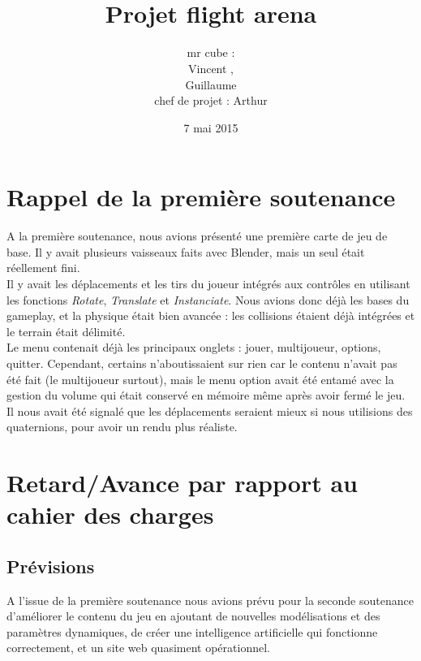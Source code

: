 \documentclass[10pt, titlepage]{report}
\title{\bsc{Rapport de la deuxième soutenance}\\Projet flight arena}
\author{mr cube :\\
Vincent \bsc{Rospini-Clerici},\\
Guillaume \bsc{Rebut}\\
chef de projet : Arthur \bsc{Remaud}}
\date{7 mai 2015}
\begin{document}
\maketitle
\renewcommand{\contentsname}{Sommaire}
\renewcommand{\chaptername}{Partie}

\tableofcontents

\chapter{Rappel de la première soutenance}

A la première soutenance, nous avions présenté une première carte de jeu de base. Il y avait plusieurs vaisseaux faits avec Blender, mais un seul était réellement fini.\\

 Il y avait les déplacements et les tirs du joueur intégrés aux contrôles en utilisant les fonctions \textit{Rotate}, \textit{Translate} et \textit{Instanciate}. Nous avions donc déjà les bases du gameplay, et la physique était bien avancée : les collisions étaient déjà intégrées et le terrain était délimité.\\

Le menu contenait déjà les principaux onglets : jouer, multijoueur, options, quitter. Cependant, certains n'aboutissaient sur rien car le contenu n'avait pas été fait (le multijoueur surtout), mais le menu option avait été entamé avec la gestion du volume qui était conservé en mémoire même après avoir fermé le jeu.\\

Il nous avait été signalé que les déplacements seraient mieux si nous utilisions des quaternions, pour avoir un rendu plus réaliste.\\

\chapter{Retard/Avance par rapport au cahier des charges}

\section{Prévisions}
A l'issue de la première soutenance nous avions prévu pour la seconde soutenance d'améliorer le contenu du jeu en ajoutant de nouvelles modélisations et des paramètres dynamiques, de créer une intelligence artificielle qui fonctionne correctement, et un site web quasiment opérationnel.\\
\end{document}
